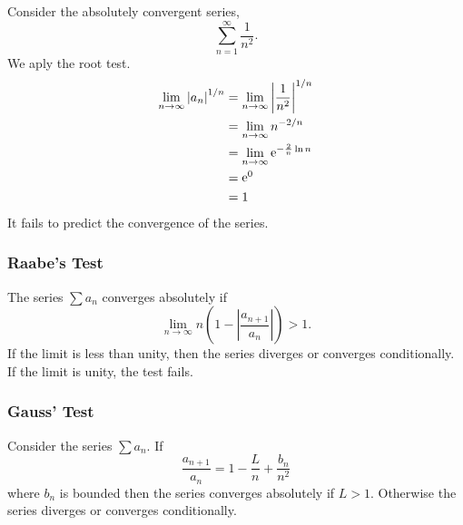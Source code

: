 \begin{Example}
  Consider the absolutely convergent series,
  \[
  \sum_{n = 1}^\infty \frac{1}{n^2}.
  \]
  We aply the root test.
  \begin{align*}
    \lim_{n \to \infty} \left| a_n \right|^{1/n}
    &= \lim_{n \to \infty} \left| \frac{1}{n^2} \right|^{1/n} 
    \\
    &= \lim_{n \to \infty} n^{-2/n} 
    \\
    &= \lim_{n \to \infty} \mathop{\mathrm{e}}\nolimits^{- \frac{2}{n} \ln n } 
    \\
    &= \mathop{\mathrm{e}}\nolimits^0 
    \\
    &= 1
  \end{align*}
  It fails to predict the convergence of the series.
\end{Example}








\subsubsection{Raabe's Test}



\begin{Result}
  The series $\sum a_n$ converges absolutely if
  \[ 
  \lim_{n \to \infty} n \left( 1 - \left| \frac{a_{n + 1}}{a_n} \right| \right) > 1.
  \]
  If the limit is less than unity, then the series diverges or converges 
  conditionally.  If the limit is unity, the test fails. 
\end{Result}




\subsubsection{Gauss' Test}

\begin{Result}
  Consider the series $\sum a_n$.  If
  \[
  \frac{a_{n+1}}{a_n} = 1 - \frac{L}{n} + \frac{b_n}{n^2}
  \]
  where $b_n$ is bounded then the series converges absolutely if 
  $L > 1$.  Otherwise the series diverges or converges conditionally.
\end{Result}








